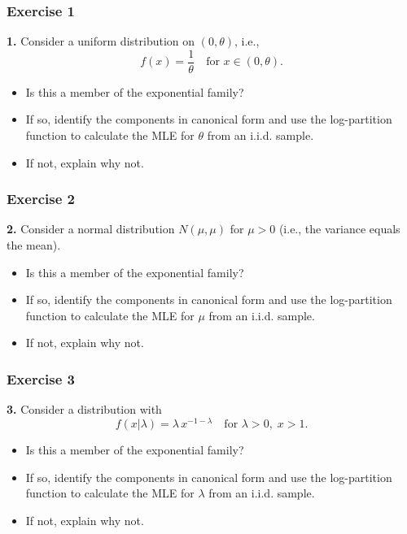 \documentclass{beamer}
\begin{document}
%

\begin{frame}
\frametitle{Exercise 1}
\textbf{1.} Consider a uniform distribution on $(0,\theta)$, i.e., 
\[
f(x)=\frac{1}{\theta}\quad\text{for } x\in (0,\theta).
\]
\begin{itemize}
  \item Is this a member of the exponential family?
  \item If so, identify the components in canonical form and use the log-partition function to calculate the MLE for $\theta$ from an i.i.d. sample.
  \item If not, explain why not.
\end{itemize}
\end{frame}






\begin{frame}
\frametitle{Exercise 2}
\textbf{2.} Consider a normal distribution $N(\mu,\mu)$ for $\mu > 0$ (i.e., the variance equals the mean).
\begin{itemize}
  \item Is this a member of the exponential family?
  \item If so, identify the components in canonical form and use the log-partition function to calculate the MLE for $\mu$ from an i.i.d. sample.
  \item If not, explain why not.
\end{itemize}
\end{frame}

\begin{frame}
\frametitle{Exercise 3}
\textbf{3.} Consider a distribution with
\[
f(x|\lambda) = \lambda\, x^{-1-\lambda} \quad \text{for } \lambda>0,\; x>1.
\]
\begin{itemize}
  \item Is this a member of the exponential family?
  \item If so, identify the components in canonical form and use the log-partition function to calculate the MLE for $\lambda$ from an i.i.d. sample.
  \item If not, explain why not.
\end{itemize}
\end{frame}
\end{document}
